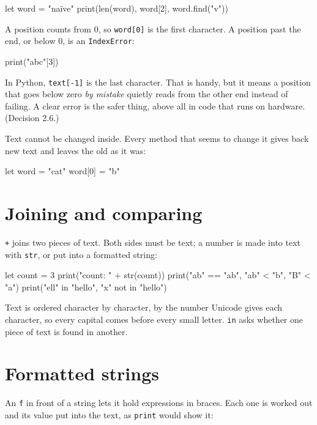 \begin{zeno}
let word = "naïve"
print(len(word), word[2], word.find("v"))
\end{zeno}

A position counts from 0, so \verb|word[0]| is the first character. A
position past the end, or below 0, is an \verb|IndexError|:

\begin{zeno}[fails=yes]
print("abc"[3])
\end{zeno}

\begin{why}
In Python, \verb|text[-1]| is the last character. That is handy, but
it means a position that goes below zero \emph{by mistake} quietly
reads from the other end instead of failing. A clear error is the
safer thing, above all in code that runs on hardware. (Decision 2.6.)
\end{why}

Text cannot be changed inside. Every method that seems to change it
gives back new text and leaves the old as it was:

\begin{zeno}[fails=yes]
let word = "cat"
word[0] = "b"
\end{zeno}

\section{Joining and comparing}

\verb|+| joins two pieces of text. Both sides must be text; a number is
made into text with \verb|str|, or put into a formatted string:

\begin{zeno}
let count = 3
print("count: " + str(count))
print("ab" == "ab", "ab" < "b", "B" < "a")
print("ell" in "hello", "x" not in "hello")
\end{zeno}

Text is ordered character by character, by the number Unicode gives
each character, so every capital comes before every small letter.
\verb|in| asks whether one piece of text is found in another.

\section{Formatted strings}

An \verb|f| in front of a string lets it hold expressions in braces.
Each one is worked out and its value put into the text, as
\verb|print| would show it:

